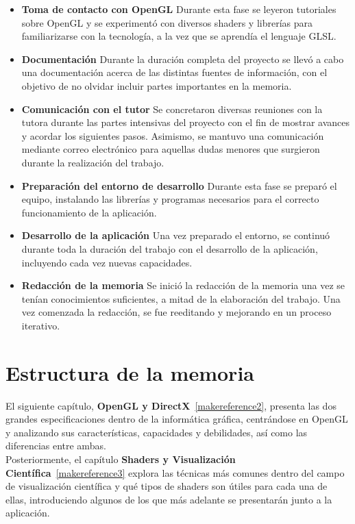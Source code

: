 \begin{itemize}
		\item \textbf{Toma de contacto con OpenGL} Durante esta fase se leyeron
				tutoriales sobre OpenGL y se experimentó con diversos shaders y
				librerías para familiarizarse con la tecnología, a la vez que se
				aprendía el lenguaje GLSL.
		\item \textbf{Documentación} Durante la duración completa del proyecto
				se llevó a cabo una documentación acerca de las distintas
				fuentes de información, con el objetivo de no olvidar incluir
				partes importantes en la memoria.
		\item \textbf{Comunicación con el tutor} Se concretaron diversas
				reuniones con la tutora durante las partes intensivas del
				proyecto con el fin de mostrar avances y acordar los siguientes
				pasos. Asimismo, se mantuvo una comunicación mediante correo
				electrónico para aquellas dudas menores que surgieron durante la
				realización del trabajo.
		\item \textbf{Preparación del entorno de desarrollo} Durante esta fase
				se preparó el equipo, instalando las librerías y programas
				necesarios para el correcto funcionamiento de la aplicación.
		\item \textbf{Desarrollo de la aplicación} Una vez preparado el entorno,
				se continuó durante toda la duración del trabajo con el
				desarrollo de la aplicación, incluyendo cada vez nuevas
				capacidades.
		\item \textbf{Redacción de la memoria} Se inició la redacción de la
				memoria una vez se tenían conocimientos suficientes, a mitad de
				la elaboración del trabajo. Una vez comenzada la redacción, se
				fue reeditando y mejorando en un proceso iterativo.
\end{itemize}

\section{Estructura de la memoria}
\label{makereference1.4}

El siguiente capítulo, \textbf{OpenGL y DirectX}~\ref{makereference2}, presenta
las dos grandes especificaciones dentro de la informática gráfica, centrándose
en OpenGL y analizando sus características, capacidades y debilidades, así como
las diferencias entre ambas.\\

Posteriormente, el capítulo \textbf{Shaders y Visualización
Científica}~\ref{makereference3} explora las técnicas más comunes dentro del
campo de visualización científica y qué tipos de shaders son útiles para cada
una de ellas, introduciendo algunos de los que más adelante se presentarán junto
a la aplicación.\\

